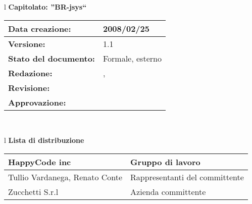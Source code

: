 


\newcommand{\lv}{ 1.1 } %
\newcommand{\dt}{ Manuale Utente }%
\newcommand{\Grammatica}{} %

\begin{center}
\thispagestyle{plain}
\begin{table}[htbp]
\large{
\begin{tabular}{l}
\Large{\textbf{\textsf{Capitolato: ''BR-jsys``}}} \\
\begin{tabular}{|p{6cm}|p{6cm}|} \hline
\textbf{Data creazione:} & 2008/02/25 \\ \hline
\textbf{Versione:} & \lv \\ \hline
\textbf{Stato del documento:} & Formale, esterno \\ \hline
\textbf{Redazione:} &  \AT, \LA \\ \hline
\textbf{Revisione:} & \FC \\ \hline
\textbf{Approvazione:} & \MM \\  \hline
\end{tabular} \\
\end{tabular}
}
\end{table}

\begin{table}[hbtp]
\large{
\begin{tabular}{l}
\Large{\textbf{\textsf{Lista di distribuzione}}} \\

\begin{tabular}{|p{6cm}|p{6cm}|} \hline
{HappyCode inc}& Gruppo di lavoro\\ \hline
{Tullio Vardanega, Renato Conte}& Rappresentanti del committente \\ \hline
{Zucchetti S.r.l}& Azienda committente\\ \hline
\end{tabular} \\
\end{tabular}
}
\end{table}
\begin{table}[hbtp]


\end{table}
\end{center}
